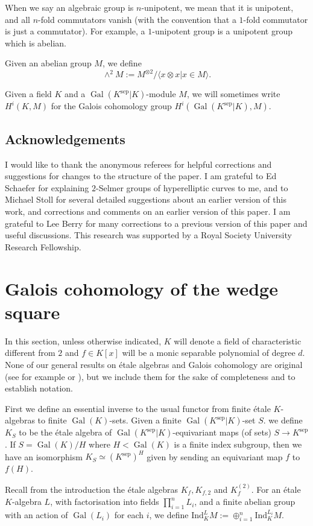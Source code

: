 \documentclass[11pt]{amsart}
\theoremstyle{plain}
\theoremstyle{definition}
\DeclareMathOperator{\Gal}{Gal}
\newcommand{\Ind}{\mathrm{Ind}}
\newcommand{\sep}{\mathrm{sep}}
\begin{document}
When we say an algebraic group is $n$-unipotent, we mean that it is unipotent, and all $n$-fold commutators vanish (with the convention that a $1$-fold commutator is just a commutator). For example, a $1$-unipotent group is a unipotent group which is abelian.

Given an abelian group $M$, we define
\[
\wedge ^2 M:= M^{\otimes 2}/\langle x\otimes x |x\in M \rangle .
\]

Given a field $K$ and a $\Gal (K^{\sep }|K)$-module $M$, we will sometimes write $H^i (K,M)$ for the Galois cohomology group $H^i (\Gal (K^{\sep }|K),M)$.
\subsection*{Acknowledgements}
I would like to thank the anonymous referees for helpful corrections and suggestions for changes to the structure of the paper. I am grateful to Ed Schaefer for explaining $2$-Selmer groups of hyperelliptic curves to me, and to Michael Stoll for several detailed suggestions about an earlier version of this work, and corrections and comments on an earlier version of this paper. I am grateful to Lee Berry for many corrections to a previous version of this paper and useful discussions. This research was supported by a Royal Society University Research Fellowship.
\section{Galois cohomology of the wedge square}\label{sec:shapiro}
In this section, unless otherwise indicated, $K$ will denote a field of characteristic different from $2$ and $f\in K[x]$ will be a monic separable polynomial of degree $d$. None of our general results on \'etale algebras and Galois cohomology are original (see for example \cite{BPS} or \cite{SS}), but we include them for the sake of completeness and to establish notation.

First we define an essential inverse to the usual functor from finite \'etale $K$-algebras to finite $\Gal (K)$-sets. 
Given a finite $\Gal (K^{\sep }|K)$-set $S$. we define $K_S$ to be the \'etale algebra of $\Gal (K^{\sep }|K)$-equivariant maps (of sets) $S\to K^{\sep }$. If $S=\Gal (K)/H$ where $H<\Gal (K)$ is a finite index subgroup, then we have an isomorphism $K_S \simeq (K^{\sep })^H$ given by sending an equivariant map $f$ to $f(H)$.

Recall from the introduction the \'etale algebras $K_f ,K_{f,2}$ and $K_f ^{(2)}$. For an \'etale $K$-algebra $L$, with factorisation into fields $\prod _{i=1}^n L_i $, and a finite abelian group with an action of $\Gal (L_i )$ for each $i$, we define $\Ind ^L _K M:=\oplus _{i=1}^n \Ind ^{L_i }_K M$.
\end{document}

